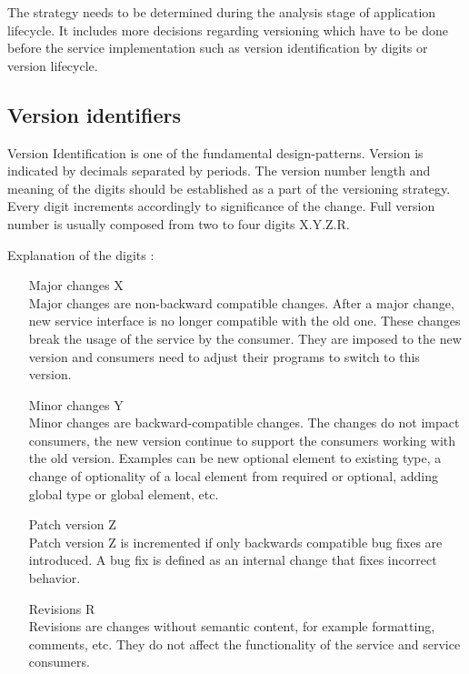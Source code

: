 The strategy needs to be determined during the analysis stage of application lifecycle. It includes more decisions regarding versioning which have to be done before the service implementation such as version identification by digits or version lifecycle.

\subsection{Version identifiers}
\label{subsec:versionid}
Version Identification is one of the fundamental \gls{design-patterns}. Version is indicated by decimals separated by periods. The version number length and meaning of the digits should be established as a part of the versioning strategy. Every digit increments accordingly to significance of the change. Full version number is usually composed from two to four digits X.Y.Z.R.

Explanation of the digits \cite{soa-governance}:

\begin{enumerate}
  \item[Major changes X] \hfill \\
  Major changes are non-backward compatible changes. After a major change, new service interface is no longer compatible with the old one. These changes break the usage of the service by the consumer. They are imposed to the new version and consumers need to adjust their programs to switch to this version. 
  
    \item[Minor changes Y] \hfill \\
  Minor changes are backward-compatible changes. The changes do not impact consumers, the new version continue to support the consumers working with the old version. Examples can be new optional element to existing type, a change of optionality of a local element from required or optional, adding global type or global element, etc.
  
  \item[Patch version Z] \hfill \\  
  Patch version Z is incremented if only backwards compatible bug fixes are introduced. A bug fix is defined as an internal change that fixes incorrect behavior.
  
  \item[Revisions R] \hfill \\ 
  Revisions are changes without semantic content, for example formatting, comments, etc. They do not affect the functionality of the service and service consumers.
\end{enumerate} 

